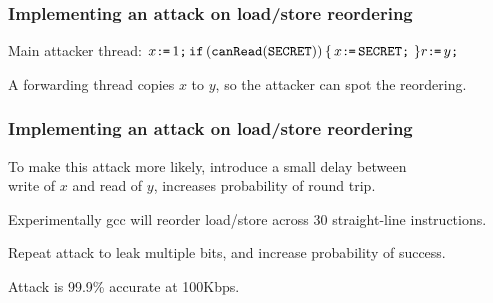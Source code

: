 \documentclass[aspectratio=169]{beamer}
\begin{document}
\begin{frame}
  \frametitle{Implementing an attack on load/store reordering}

  Main attacker thread:
  \(
    x\texttt{:}\mkern-1mu\texttt{=}\,1\texttt{;}\,
    \texttt{if}\, (\texttt{canRead}(\texttt{SECRET})) \,\{\, x\texttt{:}\mkern-1mu\texttt{=}\,\texttt{SECRET}\texttt{;}\, \,\}
    r\texttt{:}\mkern-1mu\texttt{=}\, y\texttt{;}\,
  \)

  \medskip
  
{\footnotesize{}
}

\bigskip
  A forwarding thread copies $x$ to $y$, so the attacker can spot the reordering.

\end{frame}

\begin{frame}
  \frametitle{Implementing an attack on load/store reordering}

  To make this attack more likely, introduce
  a small delay between\\
  write of $x$ and read of $y$,
  increases probability of round trip.

  \bigskip
  Experimentally gcc will reorder load/store
  across 30 straight-line instructions.

  \bigskip
  Repeat attack to leak multiple bits,
  and increase probability of success.
  
  \bigskip
  Attack is 99.9\% accurate at 100Kbps.

\end{frame}
\end{document}
